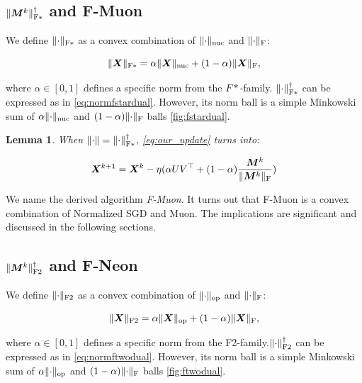 \documentclass{article} %
\newtheorem{lemma}{Lemma}
\newcommand{\norm}[1]{\lVert #1\rVert}
\DeclarePairedDelimiter{\normf}{\|}{\|_\mathrm{F}}
\DeclarePairedDelimiter{\normfstar}{\|}{\|_\mathrm{F*}}
\DeclarePairedDelimiter{\normftwo}{\|}{\|_\mathrm{F2}}
\DeclarePairedDelimiter{\norms}{\|}{\|_{\mathrm{op}}}
\DeclarePairedDelimiter{\normn}{\|}{\|_{\mathrm{nuc}}}
\begin{document}
    \subsection{\texorpdfstring{$\normfstar{\mM^{k}}^\dagger$ and F-Muon}{F-Muon}}
        We define $\normfstar{\cdot}$ as a convex combination of $\normn{\cdot}$ and $\normf{\cdot}$:

        \begin{equation}\label{eq:fstar_norm}
            \normfstar{\mX} = \alpha \normn{\mX} + (1-\alpha)\normf{\mX},
        \end{equation}

        where $\alpha \in [0, 1]$ defines a specific norm from the $F*$-family. $\normfstar{\cdot}^\dagger$ can be expressed as in \ref{eq:normfstardual}. However, its norm ball is a simple Minkowski sum of $\alpha \normn{\cdot}$ and $(1-\alpha)\normf{\cdot}$ balls \ref{fig:fstardual}.

    \begin{lemma}\label{lemma:nsgd_muon_update}
        When $\norm{\cdot} = \normfstar{\cdot}^\dagger$, \cref{eq:our_update} turns into:

        \begin{equation}\label{eq:nsgd_muon_update}
            \mX^{k+1} = \mX^{k} - \eta (\alpha U V^\top + (1-\alpha)\frac{\mM^k}{\normf{\mM^k}})
        \end{equation}
    \end{lemma}

        We name the derived algorithm \emph{F-Muon}. It turns out that F-Muon is a convex combination of Normalized SGD and Muon. The implications are significant and discussed in the following sections.

    \subsection{\texorpdfstring{$\normftwo{\mM^{k}}^\dagger$ and F-Neon}{F-Neon}}
        We define $\normftwo{\cdot}$ as a convex combination of $\norms{\cdot}$ and $\normf{\cdot}$:

        \begin{equation}\label{eq:ftwo_norm}
            \normftwo{\mX} = \alpha \norms{\mX} + (1-\alpha)\normf{\mX},
        \end{equation}

        where $\alpha \in [0, 1]$ defines a specific norm from the F2-family.$\normftwo{\cdot}^\dagger$ can be expressed as in \ref{eq:normftwodual}. However, its norm ball is a simple Minkowski sum of $\alpha \norms{\cdot}$ and $(1-\alpha)\normf{\cdot}$ balls \ref{fig:ftwodual}.
\end{document}
